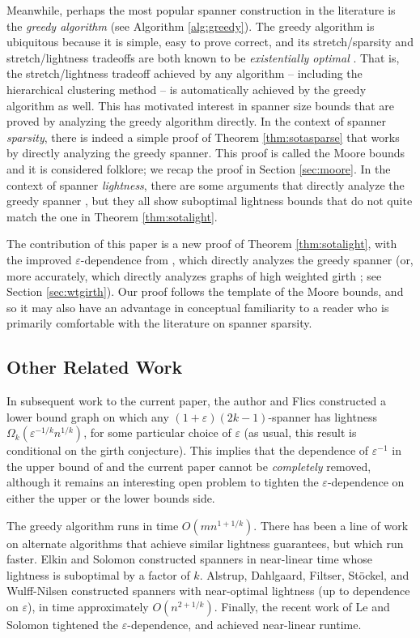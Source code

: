 \documentclass{article}\usepackage[a4paper,margin=20mm]{geometry}
\newcommand{\eps}{\varepsilon}
\begin{document}
Meanwhile, perhaps the most popular spanner construction in the literature is the \emph{greedy algorithm} (see Algorithm \ref{alg:greedy}).
The greedy algorithm is ubiquitous because it is simple, easy to prove correct, and its stretch/sparsity and stretch/lightness tradeoffs are both known to be \emph{existentially optimal} \cite{ADDJS93, FS20}.
That is, the stretch/lightness tradeoff achieved by any algorithm -- including the hierarchical clustering method \cite{CW18, LS23} -- is automatically achieved by the greedy algorithm as well.
This has motivated interest in spanner size bounds that are proved by analyzing the greedy algorithm directly.
In the context of spanner \emph{sparsity}, there is indeed a simple proof of Theorem \ref{thm:sotasparse} that works by directly analyzing the greedy spanner.
This proof is called the Moore bounds and it is considered folklore; we recap the proof in Section \ref{sec:moore}.
In the context of spanner \emph{lightness}, there are some arguments that directly analyze the greedy spanner \cite{ADDJS93, CDNS95, ENS15}, but they all show suboptimal lightness bounds that do not quite match the one in Theorem \ref{thm:sotalight}.

The contribution of this paper is a new proof of Theorem \ref{thm:sotalight}, with the improved $\eps$-dependence from \cite{LS23}, which directly analyzes the greedy spanner (or, more accurately, which directly analyzes graphs of high weighted girth \cite{ENS15}; see Section \ref{sec:wtgirth}).
Our proof follows the template of the Moore bounds, and so it may also have an advantage in conceptual familiarity to a reader who is primarily comfortable with the literature on spanner sparsity.

\subsection{Other Related Work}

In subsequent work to the current paper, the author and Flics \cite{BF24} constructed a lower bound graph on which any $(1+\eps)(2k-1)$-spanner has lightness $\Omega_k(\eps^{-1/k} n^{1/k})$, for some particular choice of $\eps$ (as usual, this result is conditional on the girth conjecture).
This implies that the dependence of $\eps^{-1}$ in the upper bound of \cite{LS23} and the current paper cannot be \emph{completely} removed, although it remains an interesting open problem to tighten the $\eps$-dependence on either the upper or the lower bounds side.

The greedy algorithm runs in time $O(mn^{1+1/k})$.
There has been a line of work on alternate algorithms that achieve similar lightness guarantees, but which run faster.
Elkin and Solomon \cite{ES16} constructed spanners in near-linear time whose lightness is suboptimal by a factor of $k$.
Alstrup, Dahlgaard, Filtser, St\"{o}ckel, and Wulff-Nilsen \cite{ADFSW22} constructed spanners with near-optimal lightness (up to dependence on $\eps$), in time approximately $O(n^{2 + 1/k})$.
Finally, the recent work of Le and Solomon \cite{LS23} tightened the $\eps$-dependence, and achieved near-linear runtime.
\end{document}
